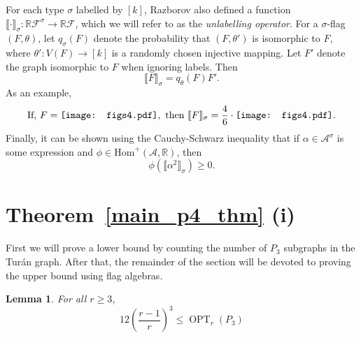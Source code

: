 \documentclass[12pt]{article}
\newtheorem{lemma}[thm]{Lemma}
\DeclareMathOperator{\OPT}{OPT}
\newcommand{\vc}[1]{\ensuremath{\vcenter{\hbox{#1}}}}
\newcommand{\ffrg}{\vc{\texttt{[image: figs4.pdf]}}}
\newcommand{\figsfourlabeltwo}{\vc{\texttt{[image: figs4.pdf]}}}
\begin{document}
For each type $\sigma$ labelled by $[k]$, Razborov also defined a function $\llbracket \cdot \rrbracket_{\sigma}: \mathbb{R}\mathcal{F}^{\sigma} \to \mathbb{R}\mathcal{F}$, which we will refer to as the \emph{unlabelling operator}. For a $\sigma$-flag $(F,\theta)$, let $q_{\sigma}(F)$ denote the probability that $(F,\theta')$ is isomorphic to $F$, where $\theta ': V(F) \to [k]$ is a randomly chosen injective mapping. Let $F'$ denote the graph isomorphic to $F$ when ignoring labels. Then
\[ \llbracket F \rrbracket_{\sigma} = q_{\theta}(F)F'.\]
As an example,
\[\text{If, } F = \figsfourlabeltwo, \text{ then }  \llbracket F \rrbracket_{\sigma} = \frac{4}{6} \cdot  \ffrg.\]
Finally, it can be shown using the Cauchy-Schwarz inequality that if $\alpha \in \mathcal{A}^{\sigma}$ is some expression and $\phi \in \text{Hom}^+(\mathcal{A},\mathbb{R})$, then 
\begin{equation}\label{eq: C-S for flags}
   \phi\left(\llbracket \alpha^2 \rrbracket_{\sigma}\right) \geq 0. 
\end{equation}

\section{Theorem~\ref{main_p4_thm} (i)}\label{sec:part_i_proof}

First we will prove a lower bound by counting the number of $P_3$ subgraphs in the Tur\'{a}n graph. After that, the remainder of the section will be devoted to proving the upper bound using flag algebras. 

\begin{lemma}\label{lem:opt_lower_bound}
For all $r \ge 3$,
\[ 12\left(\frac{r-1}{r}\right)^3 \leq \OPT_r(P_3) \]
\end{lemma}
\end{document}
